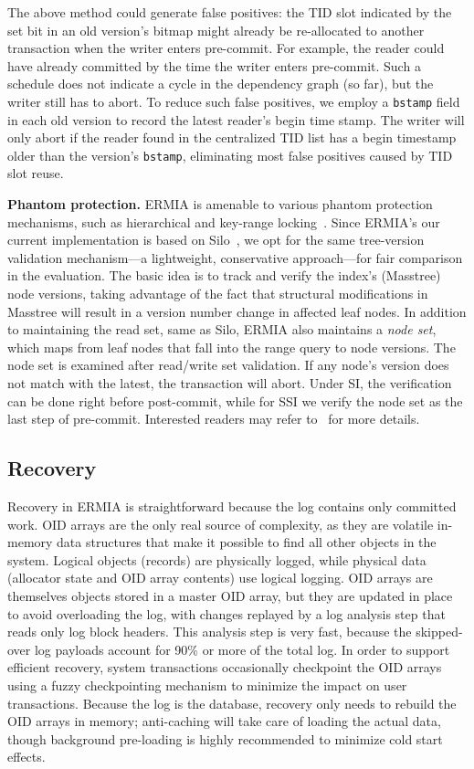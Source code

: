 The above method could generate false positives: the TID slot indicated by the set bit in an old version's bitmap might already be re-allocated to another transaction when the writer enters pre-commit. For example, the reader could have already committed by the time the writer enters pre-commit. Such a schedule does not indicate a cycle in the dependency graph (so far), but the writer still has to abort. To reduce such false positives, we employ a \texttt{bstamp} field in each old version to record the latest reader's begin time stamp. The writer will only abort if the reader found in the centralized TID list has a begin timestamp older than the version's \texttt{bstamp}, eliminating most false positives caused by TID slot reuse.

{\bf Phantom protection.} ERMIA is amenable to various phantom protection mechanisms, such as hierarchical and key-range locking~\cite{KimuraGK12,Lomet93}. Since ERMIA's our current implementation is based on Silo~\cite{TuZKLM13}, we opt for the same tree-version validation mechanism---a lightweight, conservative approach---for fair comparison in the evaluation. The basic idea is to track and verify the index's (Masstree) node versions, taking advantage of the fact that structural modifications in Masstree will result in a version number change in affected leaf nodes. In addition to maintaining the read set, same as Silo, ERMIA also maintains a \textit{node set}, which maps from leaf nodes that fall into the range query to node versions. The node set is examined after read/write set validation. If any node's version does not match with the latest, the transaction will abort. Under SI, the verification can be done right before post-commit, while for SSI we verify the node set as the last step of pre-commit. Interested readers may refer to~\cite{TuZKLM13} for more details.

\subsection{Recovery}

Recovery in ERMIA is straightforward because the log contains only committed work. OID arrays are the only real source of complexity, as they are volatile in-memory data structures that make it possible to find all other objects in the system. Logical objects (records) are physically logged, while physical data (allocator state and OID array contents) use logical logging. OID arrays are themselves objects stored in a master OID array, but they are updated in place to avoid overloading the log, with changes replayed by a log analysis step that reads only log block headers. This analysis step is very fast, because the skipped-over log payloads account for 90\% or more of the total log. In order to support efficient recovery, system transactions occasionally checkpoint the OID arrays using a fuzzy checkpointing mechanism to minimize the impact on user transactions. Because the log is the database, recovery only needs to rebuild the OID arrays in memory; anti-caching will take care of loading the actual data, though background pre-loading is highly recommended to minimize cold start effects.

